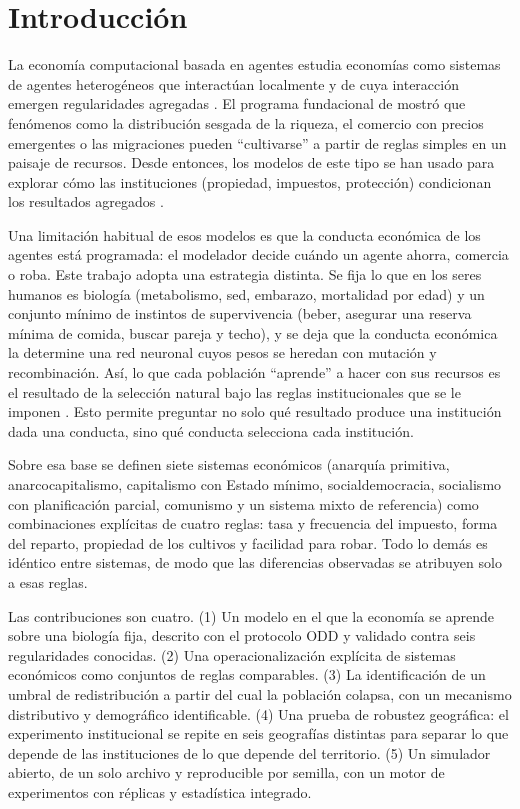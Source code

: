 \documentclass[11pt,a4paper]{article}
\begin{document}
\section{Introducción}
La economía computacional basada en agentes estudia economías como sistemas de agentes heterogéneos que interactúan localmente y de cuya interacción emergen regularidades agregadas \citep{tesfatsion2006ace}. El programa fundacional de \citet{epstein1996growing} mostró que fenómenos como la distribución sesgada de la riqueza, el comercio con precios emergentes o las migraciones pueden ``cultivarse'' a partir de reglas simples en un paisaje de recursos. Desde entonces, los modelos de este tipo se han usado para explorar cómo las instituciones (propiedad, impuestos, protección) condicionan los resultados agregados \citep{north1990,axelrod1997}.

Una limitación habitual de esos modelos es que la conducta económica de los agentes está programada: el modelador decide cuándo un agente ahorra, comercia o roba. Este trabajo adopta una estrategia distinta. Se fija lo que en los seres humanos es biología (metabolismo, sed, embarazo, mortalidad por edad) y un conjunto mínimo de instintos de supervivencia (beber, asegurar una reserva mínima de comida, buscar pareja y techo), y se deja que la conducta económica la determine una red neuronal cuyos pesos se heredan con mutación y recombinación. Así, lo que cada población ``aprende'' a hacer con sus recursos es el resultado de la selección natural bajo las reglas institucionales que se le imponen \citep{holland1975,stanley2002neat}. Esto permite preguntar no solo qué resultado produce una institución dada una conducta, sino qué conducta selecciona cada institución.

Sobre esa base se definen siete sistemas económicos (anarquía primitiva, anarcocapitalismo, capitalismo con Estado mínimo, socialdemocracia, socialismo con planificación parcial, comunismo y un sistema mixto de referencia) como combinaciones explícitas de cuatro reglas: tasa y frecuencia del impuesto, forma del reparto, propiedad de los cultivos y facilidad para robar. Todo lo demás es idéntico entre sistemas, de modo que las diferencias observadas se atribuyen solo a esas reglas.

Las contribuciones son cuatro. (1) Un modelo en el que la economía se aprende sobre una biología fija, descrito con el protocolo ODD \citep{grimm2020odd} y validado contra seis regularidades conocidas. (2) Una operacionalización explícita de sistemas económicos como conjuntos de reglas comparables. (3) La identificación de un umbral de redistribución a partir del cual la población colapsa, con un mecanismo distributivo y demográfico identificable. (4) Una prueba de robustez geográfica: el experimento institucional se repite en seis geografías distintas para separar lo que depende de las instituciones de lo que depende del territorio. (5) Un simulador abierto, de un solo archivo y reproducible por semilla, con un motor de experimentos con réplicas y estadística integrado.
\end{document}
